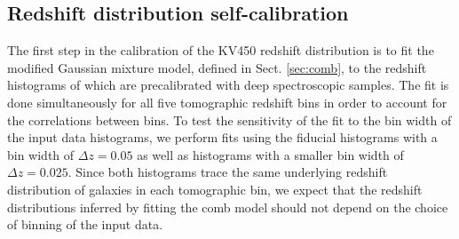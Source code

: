 \documentclass{aa}
\begin{document}
\subsection{Redshift distribution self-calibration}
\label{sec:redshift_calibration}
The first step in the calibration of the KV450 redshift distribution is to fit the modified Gaussian mixture model, defined in Sect. \ref{sec:comb}, to the redshift histograms of \cite{hildebrandt18} which are precalibrated with deep spectroscopic samples. The fit is done simultaneously for all five tomographic redshift bins in order to account for the correlations between bins. To test the sensitivity of the fit to the bin width of the input data histograms, we perform fits using the fiducial histograms with a bin width of $\Delta z = 0.05$ as well as histograms with a smaller bin width of $\Delta z = 0.025$.  Since both histograms trace the same underlying redshift distribution of galaxies in each tomographic bin, we expect that the redshift distributions inferred by fitting the comb model should not depend on the choice of binning of the input data.
\end{document}
